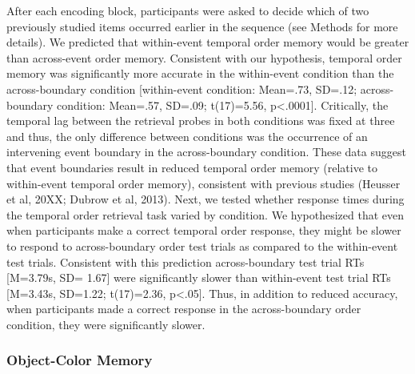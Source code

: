 After each encoding block, participants were asked to decide which of
two previously studied items occurred earlier in the sequence (see
Methods for more details). We predicted that within-event temporal order
memory would be greater than across-event order memory. Consistent with
our hypothesis, temporal order memory was significantly more accurate in
the within-event condition than the across-boundary condition
{[}within-event condition: Mean=.73, SD=.12; across-boundary condition:
Mean=.57, SD=.09; t(17)=5.56, p\textless{}.0001{]}. Critically, the
temporal lag between the retrieval probes in both conditions was fixed
at three and thus, the only difference between conditions was the
occurrence of an intervening event boundary in the across-boundary
condition. These data suggest that event boundaries result in reduced
temporal order memory (relative to within-event temporal order memory),
consistent with previous studies (Heusser et al, 20XX; Dubrow et al,
2013). Next, we tested whether response times during the temporal order
retrieval task varied by condition. We hypothesized that even when
participants make a correct temporal order response, they might be
slower to respond to across-boundary order test trials as compared to
the within-event test trials. Consistent with this prediction
across-boundary test trial RTs {[}M=3.79s, SD= 1.67{]} were
significantly slower than within-event test trial RTs {[}M=3.43s,
SD=1.22; t(17)=2.36, p\textless{}.05{]}. Thus, in addition to reduced
accuracy, when participants made a correct response in the
across-boundary order condition, they were significantly slower.

\subsubsection{Object-Color Memory}\label{object-color-memory}

